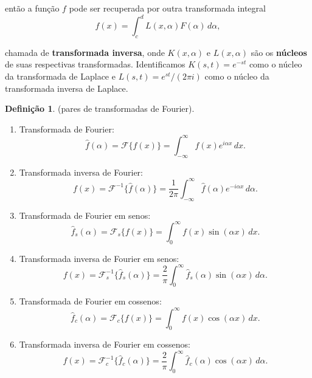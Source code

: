 \documentclass{article}
\theoremstyle{plain}
\theoremstyle{definition}
\newtheorem{defn}{Definição}[section]
\theoremstyle{remark}
\begin{document}
\noindent então a função \(f\) pode ser recuperada por outra transformada integral 
\begin{equation}
    f(x) = \int_{c}^{d} L(x,\alpha) F(\alpha) \, d\alpha,
\end{equation}

\noindent chamada de \textbf{transformada inversa}, onde \(K(x,\alpha)\) e \(L(x,\alpha)\) são os \textbf{núcleos} de suas respectivas transformadas. Identificamos \(K(s,t)=e^{-st}\) como o núcleo da transformada de Laplace e \(L(s,t) = e^{st}/(2\pi i)\) como o núcleo da transformada inversa de Laplace.

\begin{defn} (pares de transformadas de Fourier).
    \begin{enumerate}
        \item[(i)] Transformada de Fourier: \begin{equation}
            \widehat{f}(\alpha) = \mathcal{F}\{f(x)\} = \int_{-\infty}^{\infty} f(x) e^{i\alpha x} \, dx.
        \end{equation}
        \item[] Transformada inversa de Fourier: \begin{equation}
            f(x) = \mathcal{F}^{-1}\{\widehat{f}(\alpha)\} = \frac{1}{2\pi} \int_{-\infty}^{\infty} \widehat{f}(\alpha) e^{-i\alpha x} \, d\alpha.
        \end{equation}
        \item[(ii)] Transformada de Fourier em senos: \begin{equation}
            \widehat{f}_s(\alpha) = \mathcal{F}_s\{f(x)\} = \int_{0}^{\infty} f(x) \sin(\alpha x) \, dx.
        \end{equation}
        \item[] Transformada inversa de Fourier em senos: \begin{equation}
            f(x) = \mathcal{F}_s^{-1}\{\widehat{f}_s(\alpha)\} = \frac{2}{\pi} \int_{0}^{\infty} \widehat{f}_s(\alpha) \sin(\alpha x) \, d\alpha.
        \end{equation}
        \item[(iii)] Transformada de Fourier em cossenos: \begin{equation}
            \widehat{f}_c(\alpha) = \mathcal{F}_c\{f(x)\} = \int_{0}^{\infty} f(x) \cos(\alpha x) \, dx.
        \end{equation}
        \item[] Transformada inversa de Fourier em cossenos: \begin{equation}
            f(x) = \mathcal{F}_c^{-1}\{\widehat{f}_c(\alpha)\} = \frac{2}{\pi} \int_{0}^{\infty} \widehat{f}_c(\alpha) \cos(\alpha x) \, d\alpha.
        \end{equation}
    \end{enumerate}
\end{defn}
\end{document}
